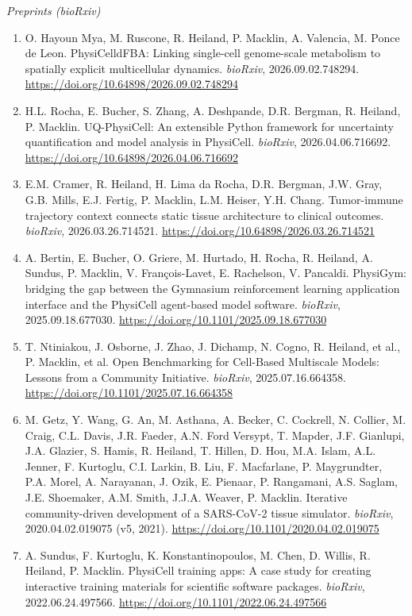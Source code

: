 \documentclass[11pt]{article}
\begin{document}
\textit{Preprints (bioRxiv)}

\begin{enumerate}[leftmargin=*, itemsep=3pt, topsep=4pt]
    \item O. Hayoun Mya, M. Ruscone, R. Heiland, P. Macklin, A. Valencia, M. Ponce de Leon. PhysiCelldFBA: Linking single-cell genome-scale metabolism to spatially explicit multicellular dynamics. \textit{bioRxiv}, 2026.09.02.748294. \url{https://doi.org/10.64898/2026.09.02.748294}

    \item H.L. Rocha, E. Bucher, S. Zhang, A. Deshpande, D.R. Bergman, R. Heiland, P. Macklin. UQ-PhysiCell: An extensible Python framework for uncertainty quantification and model analysis in PhysiCell. \textit{bioRxiv}, 2026.04.06.716692. \url{https://doi.org/10.64898/2026.04.06.716692}

    \item E.M. Cramer, R. Heiland, H. Lima da Rocha, D.R. Bergman, J.W. Gray, G.B. Mills, E.J. Fertig, P. Macklin, L.M. Heiser, Y.H. Chang. Tumor-immune trajectory context connects static tissue architecture to clinical outcomes. \textit{bioRxiv}, 2026.03.26.714521. \url{https://doi.org/10.64898/2026.03.26.714521}

    \item A. Bertin, E. Bucher, O. Griere, M. Hurtado, H. Rocha, R. Heiland, A. Sundus, P. Macklin, V. Fran\c{c}ois-Lavet, E. Rachelson, V. Pancaldi. PhysiGym: bridging the gap between the Gymnasium reinforcement learning application interface and the PhysiCell agent-based model software. \textit{bioRxiv}, 2025.09.18.677030. \url{https://doi.org/10.1101/2025.09.18.677030}

    \item T. Ntiniakou, J. Osborne, J. Zhao, J. Dichamp, N. Cogno, R. Heiland, et al., P. Macklin, et al. Open Benchmarking for Cell-Based Multiscale Models: Lessons from a Community Initiative. \textit{bioRxiv}, 2025.07.16.664358. \url{https://doi.org/10.1101/2025.07.16.664358}

    \item M. Getz, Y. Wang, G. An, M. Asthana, A. Becker, C. Cockrell, N. Collier, M. Craig, C.L. Davis, J.R. Faeder, A.N. Ford Versypt, T. Mapder, J.F. Gianlupi, J.A. Glazier, S. Hamis, R. Heiland, T. Hillen, D. Hou, M.A. Islam, A.L. Jenner, F. Kurtoglu, C.I. Larkin, B. Liu, F. Macfarlane, P. Maygrundter, P.A. Morel, A. Narayanan, J. Ozik, E. Pienaar, P. Rangamani, A.S. Saglam, J.E. Shoemaker, A.M. Smith, J.J.A. Weaver, P. Macklin. Iterative community-driven development of a SARS-CoV-2 tissue simulator. \textit{bioRxiv}, 2020.04.02.019075 (v5, 2021). \url{https://doi.org/10.1101/2020.04.02.019075}

    \item A. Sundus, F. Kurtoglu, K. Konstantinopoulos, M. Chen, D. Willis, R. Heiland, P. Macklin. PhysiCell training apps: A case study for creating interactive training materials for scientific software packages. \textit{bioRxiv}, 2022.06.24.497566. \url{https://doi.org/10.1101/2022.06.24.497566}
\end{enumerate}
\end{document}
